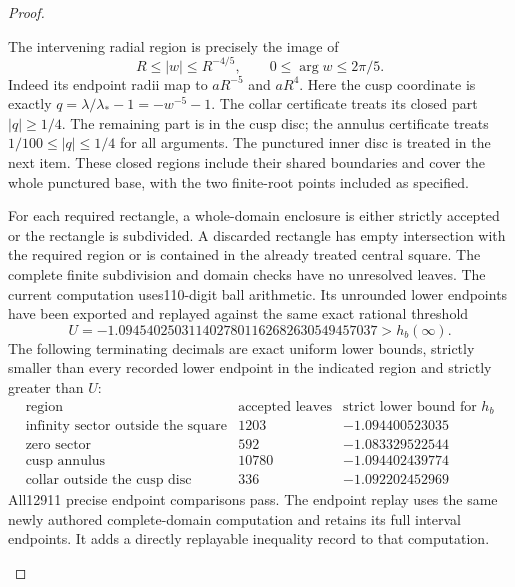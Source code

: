 \documentclass[11pt,a4paper]{article}
\theoremstyle{definition}
\begin{document}
\begin{proof}
\begin{enumerate}[label=\arabic*.]
The intervening radial region is precisely the image of
\[
 R\le|w|\le R^{-4/5},\qquad 0\le\arg w\le2\pi/5.
\]
Indeed its endpoint radii map to $aR^{-5}$ and $aR^4$.
Here the cusp coordinate is exactly
$q=\lambda/\lambda_*-1=-w^{-5}-1$.
The collar certificate treats its closed part $|q|\ge1/4$.
The remaining part is in the cusp disc; the annulus certificate
treats $1/100\le|q|\le1/4$ for all arguments. The punctured
inner disc is treated in the next item. These closed regions
include their shared boundaries and cover the whole punctured
base, with the two finite-root points included as specified.

For each required rectangle, a whole-domain enclosure is either
strictly accepted or the rectangle is subdivided. A discarded
rectangle has empty intersection with the required region or is
contained in the already treated central square. The complete
finite subdivision and domain checks have no unresolved leaves.
The current computation uses110-digit ball arithmetic. Its
unrounded lower endpoints have been exported and replayed against
the same exact rational threshold
\[
 U=-1.0945402503114027801162682630549457037
       >h_b(\infty).
\]
The following terminating decimals are exact uniform lower
bounds, strictly smaller than every recorded lower endpoint
in the indicated region and strictly greater than $U$:
\[
 \begin{array}{lrr}
 \text{region}&\text{accepted leaves}&\text{strict lower bound for }h_b\\
 \hline
 \text{infinity sector outside the square}&1203&-1.094400523035\\
 \text{zero sector}&592&-1.083329522544\\
 \text{cusp annulus}&10780&-1.094402439774\\
 \text{collar outside the cusp disc}&336&-1.092202452969
 \end{array}
\]
All12911 precise endpoint comparisons pass. The endpoint replay
uses the same newly authored complete-domain computation and
retains its full interval endpoints. It adds a directly
replayable inequality record to that computation.


\end{enumerate}
\end{proof}
\end{document}
